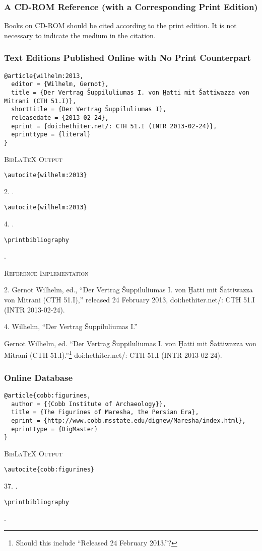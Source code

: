 \documentclass[a4paper]{article}
\newcommand\citetestnp[3]{%
  {\textsc{BibLaTeX Output}\par
   \nobreak
   \texttt{\textbackslash autocite\{#3\}}\par
   \color{biblatex-colour}
   #1. \cite{#3}.\par
   \color{black}
   \texttt{\textbackslash autocite\{#3\}}\par
   \color{biblatex-colour}
   #2. \cite{#3}.\par
   \color{black}
   \texttt{\textbackslash printbibliography}\par
   \color{biblatex-colour}
   \hangindent\bibindent\bibentrycite{#3}.\par}}
\newcommand\citetestnsnp[2]{%
  {\textsc{BibLaTeX Output}\par
   \nobreak
   \texttt{\textbackslash autocite\{#2\}}\par
   \color{biblatex-colour}
   #1. \cite{#2}.\par
   \color{black}
   \texttt{\textbackslash printbibliography}\par
   \color{biblatex-colour}
   \hangindent\bibindent\bibentrycite{#2}.\par}}
\newenvironment{refimp}{%
  \begin{minipage}{\linewidth}
    \setlength{\parskip}{1ex}
    \textsc{Reference Implementation}\par
    \nobreak
    \color{reference-colour}
}{\end{minipage}}
\begin{document}
\subsubsection{A CD-ROM Reference (with a Corresponding Print Edition)}

Books on CD-ROM should be cited according to the print edition. It is not
necessary to indicate the medium in the citation.

\subsubsection{Text Editions Published Online with No Print Counterpart}

\begin{lstlisting}
@article{wilhelm:2013,
  editor = {Wilhelm, Gernot},
  title = {Der Vertrag Šuppiluliumas I. von Ḫatti mit Šattiwazza von Mitrani (CTH 51.I)},
  shorttitle = {Der Vertrag Šuppiluliumas I},
  releasedate = {2013-02-24},
  eprint = {doi:hethiter.net/: CTH 51.I (INTR 2013-02-24)},
  eprinttype = {literal}
}
\end{lstlisting}

\citetestnp{2}{4}{wilhelm:2013}

\begin{refimp}
  2. Gernot Wilhelm, ed., “Der Vertrag Šuppiluliumas I. von Ḫatti mit
  Šattiwazza von Mitrani (CTH 51.I),” released 24 February 2013,
  doi:hethiter.net/: CTH 51.I (INTR 2013-02-24).

  4. Wilhelm, “Der Vertrag Šuppiluliumas I.”

  \hangindent\bibindent Gernot Wilhelm, ed. “Der Vertrag Šuppiluliumas I. von
  Ḫatti mit Šattiwazza von Mitrani (CTH 51.I).”\footnote{Should this include
  “Released 24 February 2013.”?} doi:hethiter.net/: CTH 51.I
  (INTR 2013-02-24).
\end{refimp}

\subsubsection{Online Database}

\begin{lstlisting}
@article{cobb:figurines,
  author = {{Cobb Institute of Archaeology}},
  title = {The Figurines of Maresha, the Persian Era},
  eprint = {http://www.cobb.msstate.edu/dignew/Maresha/index.html},
  eprinttype = {DigMaster}
}
\end{lstlisting}

\citetestnsnp{37}{cobb:figurines}
\end{document}
